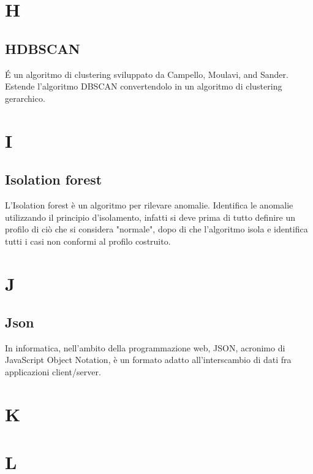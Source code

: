 \newpage
\section{H}
\subsection{HDBSCAN}
\'E un algoritmo di clustering sviluppato da Campello, Moulavi, and Sander. Estende l'algoritmo DBSCAN convertendolo in un algoritmo di clustering gerarchico.

\newpage
\section{I}
\subsection{Isolation forest}
L'Isolation forest è un algoritmo per rilevare anomalie. Identifica le anomalie utilizzando il principio d'isolamento, infatti si deve prima di tutto definire un profilo di ciò che si considera "normale", dopo di che l'algoritmo isola e identifica tutti i casi non conformi al profilo costruito. 

\newpage
\section{J}
\subsection{Json}
In informatica, nell'ambito della programmazione web, JSON, acronimo di JavaScript Object Notation, è un formato adatto all'interscambio di dati fra applicazioni client/server.

\newpage
\section{K}

\newpage
\section{L}

